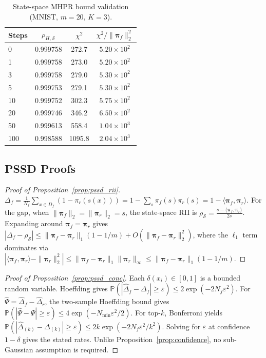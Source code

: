 \documentclass[smallextended]{svjour3}       %
\begin{document}
\begin{table}[t]
\centering
\small
\caption{State-space MHPR bound validation (MNIST, $m{=}20$, $K{=}3$).}\label{tab:chi2}
\setlength{\tabcolsep}{6pt}
\begin{tabular}{l c c c}
\toprule
Steps & $\rho_{H,\mathcal{S}}$ & $\chi^2$ & $\chi^2/\|\boldsymbol{\pi}_f\|_2^2$ \\
\midrule
0     & 0.999758 & 272.7 & $5.20\times 10^2$ \\
1     & 0.999758 & 273.0 & $5.20\times 10^2$ \\
3     & 0.999758 & 279.0 & $5.30\times 10^2$ \\
5     & 0.999753 & 279.1 & $5.30\times 10^2$ \\
10    & 0.999752 & 302.3 & $5.75\times 10^2$ \\
20    & 0.999746 & 346.2 & $6.50\times 10^2$ \\
50    & 0.999613 & 558.4 & $1.04\times 10^3$ \\
100   & 0.998588 & 1095.8 & $2.04\times 10^3$ \\
\bottomrule
\end{tabular}
\end{table}

\subsection{PSSD Proofs}

\begin{proof}[Proof of Proposition~\ref{prop:pssd_rii}]
$\Delta_f = \frac1{N_f}\sum_{x\in D_f}(1-\pi_r(s(x))) = 1-\sum_s\pi_f(s)\pi_r(s)=1-\langle\boldsymbol{\pi}_f,\boldsymbol{\pi}_r\rangle$. For the gap, when $\|\boldsymbol{\pi}_f\|_2=\|\boldsymbol{\pi}_r\|_2=s$, the state-space RII is $\rho_{\mathcal{S}}=\frac{s-\langle\boldsymbol{\pi}_f,\boldsymbol{\pi}_r\rangle}{2s}$. Expanding around $\boldsymbol{\pi}_f=\boldsymbol{\pi}_r$ gives $|\Delta_f-\rho_{\mathcal{S}}|\le\|\boldsymbol{\pi}_f-\boldsymbol{\pi}_r\|_1(1-1/m)+O(\|\boldsymbol{\pi}_f-\boldsymbol{\pi}_r\|_2^2)$, where the $\ell_1$ term dominates via $|\langle\boldsymbol{\pi}_f,\boldsymbol{\pi}_r\rangle-\|\boldsymbol{\pi}_r\|_2^2|\le\|\boldsymbol{\pi}_f-\boldsymbol{\pi}_r\|_1\|\boldsymbol{\pi}_r\|_\infty\le\|\boldsymbol{\pi}_f-\boldsymbol{\pi}_r\|_1(1-1/m)$.
\end{proof}

\begin{proof}[Proof of Proposition~\ref{prop:pssd_conc}]
Each $\delta(x_i)\in[0,1]$ is a bounded random variable. Hoeffding gives $\mathbb{P}(|\hat{\Delta}_f-\Delta_f|\ge\varepsilon) \le 2\exp(-2N_f\varepsilon^2)$. For $\hat{\Psi}=\hat{\Delta}_f-\hat{\Delta}_r$, the two-sample Hoeffding bound gives $\mathbb{P}(|\hat{\Psi}-\Psi|\ge\varepsilon) \le 4\exp(-N_{\min}\varepsilon^2/2)$. For top-$k$, Bonferroni yields $\mathbb{P}(|\hat{\Delta}_{(k)}-\Delta_{(k)}|\ge\varepsilon) \le 2k\exp(-2N_f\varepsilon^2/k^2)$. Solving for $\varepsilon$ at confidence $1-\delta$ gives the stated rates. Unlike Proposition~\ref{prop:confidence}, no sub-Gaussian assumption is required.
\end{proof}
\end{document}
